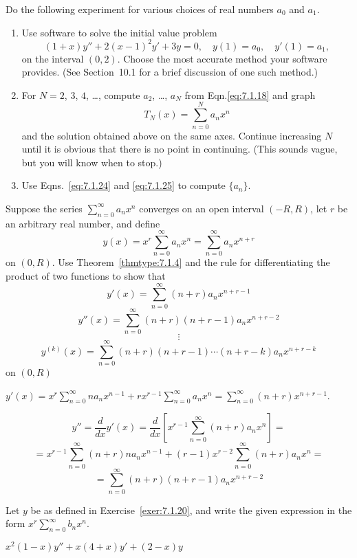 \documentclass{ximera}
\begin{document}
\begin{problem}\label{exer:7.1.19}  
Do the following experiment for various choices of
real numbers  $a_0$ and $a_1$.
\begin{enumerate}
\item %
Use software  to solve the initial value problem
$$
(1+x)y''+2(x-1)^2y'+3y=0,\quad y(1)=a_0,\quad y'(1)=a_1,
$$
on the interval $(0,2)$. Choose the most accurate method
your software provides.
(See Section~10.1 for a brief discussion of one such
method.)
\item %
For $N=2$, $3$, $4$, \dots, compute $a_2$, \dots, $a_N$
from Eqn.\eqref{eq:7.1.18} and graph
$$
T_N(x)=\sum_{n=0}^N a_nx^n
$$
and the solution obtained above on the same axes.
Continue increasing $N$ until it is obvious that there is
no point in continuing.
(This sounds vague, but you will know when to stop.)
\item Use Eqns.~\eqref{eq:7.1.24} and \eqref{eq:7.1.25}
to compute $\{a_n\}$.
\end{enumerate}
\end{problem}

\begin{problem}\label{exer:7.1.20}
Suppose the series $\sum_{n=0}^\infty a_nx^n$ converges on an
open interval $(-R,R)$, let $r$ be an arbitrary real number, and
define
$$
y(x)=x^r\sum_{n=0}^\infty a_nx^n=\sum_{n=0}^\infty a_nx^{n+r}
$$
on $(0,R)$. Use Theorem~\ref{thmtype:7.1.4} and the rule for
differentiating the product of two functions to show that
$$y'(x)=\sum_{n=0}^\infty  (n+r)a_nx^{n+r-1}$$
$$
y''(x)=\sum_{n=0}^\infty(n+r)(n+r-1)a_nx^{n+r-2}
$$
$$
\vdots
$$
$$
y^{(k)}(x)=\sum_{n=0}^\infty(n+r)(n+r-1)\cdots(n+r-k)a_nx^{n+r-k}
$$
on $(0,R)$

\begin{solution}
    $y'(x)=x^r\sum_{n=0}^\infty na_nx^{n-1}+rx^{r-1}\sum_{n=0}^\infty
a_nx^n=\sum_{n=0}^\infty (n+r)x^{n+r-1}$.

$$y''=\frac{d}{ dx}y'(x)=\frac{d}{ dx}\left[x^{r-1}\sum_{n=0}^\infty
(n+r)a_nx^n\right]=$$
$$=x^{r-1}\sum_{n=0}^\infty (n+r)na_nx^{n-1}+
(r-1)x^{r-2}\sum_{n=0}^\infty (n+r)a_nx^n=$$
$$=\sum_{n=0}^\infty
(n+r)(n+r-1)a_nx^{n+r-2}
$$
\end{solution}
\end{problem}

\begin{problem}\label{exer:7.1.21}
Let $y$ be as defined in Exercise~\ref{exer:7.1.20}, and write the given
expression in the form $x^r\sum_{n=0}^\infty b_nx^n$.

$x^2(1-x)y''+x(4+x)y'+(2-x)y$
\end{problem}
\end{document}
